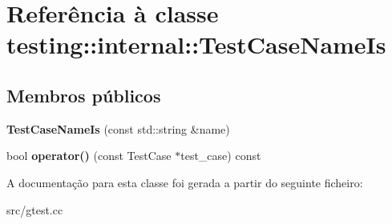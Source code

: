 \hypertarget{classtesting_1_1internal_1_1TestCaseNameIs}{\section{Referência à classe testing\-:\-:internal\-:\-:Test\-Case\-Name\-Is}
\label{classtesting_1_1internal_1_1TestCaseNameIs}
}
\subsection*{Membros públicos}
\begin{DoxyCompactItemize}
\item 
\hypertarget{classtesting_1_1internal_1_1TestCaseNameIs_a7c983707f4cfe7f36dbabc95da5113c4}{{\bfseries Test\-Case\-Name\-Is} (const std\-::string \&name)}\label{classtesting_1_1internal_1_1TestCaseNameIs_a7c983707f4cfe7f36dbabc95da5113c4}

\item 
\hypertarget{classtesting_1_1internal_1_1TestCaseNameIs_a6d6b1bf43aa7105aee9ef44edbc6d2e8}{bool {\bfseries operator()} (const Test\-Case $\ast$test\-\_\-case) const }\label{classtesting_1_1internal_1_1TestCaseNameIs_a6d6b1bf43aa7105aee9ef44edbc6d2e8}

\end{DoxyCompactItemize}


A documentação para esta classe foi gerada a partir do seguinte ficheiro\-:\begin{DoxyCompactItemize}
\item 
src/gtest.\-cc\end{DoxyCompactItemize}
